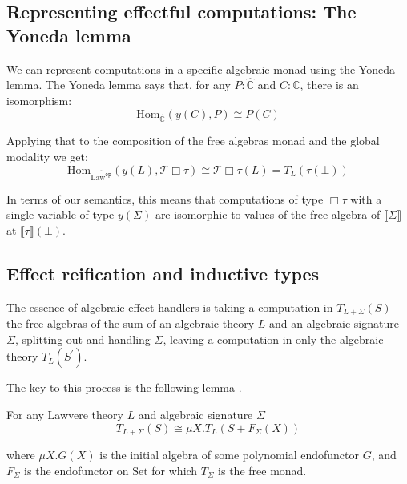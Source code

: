 \documentclass[acmsmall, screen, nonacm]{acmart}
\theoremstyle{definition}
\newcommand{\glob}{\mathop{\Box}}
\newcommand{\cat}{\mathbb{C}}
\newcommand{\catobj}{C}
\newcommand{\setc}{\mathrm{Set}}
\newcommand{\psh}{\widehat{\cat}}
\newcommand{\initial}{\bot}
\newcommand{\lawc}{\mathrm{Law}}
\newcommand{\lawcop}{\lawc^{\mathtt{op}}}
\newcommand{\pshlawcop}{\widehat{\lawcop}}
\newcommand{\yoneda}[1]{y(#1)}
\newcommand{\homset}[3]{\mathrm{Hom}_{#1}(#2, #3)}
\newcommand{\sem}[1]{\llbracket #1 \rrbracket}
\newcommand{\mon}{\mathcal{T}}
\newcommand{\types}{\mathrel{:}}
\begin{document}
\subsection{Representing effectful computations: The Yoneda lemma}

We can represent computations in a specific algebraic monad using the
Yoneda lemma. The Yoneda lemma says that, for any $P \types \psh$ and
$\catobj \types \cat$, there is an isomorphism:
\begin{equation*}
  \homset{\psh}{\yoneda{\catobj}}{P} \cong P(\catobj)
\end{equation*}

Applying that to the composition of the free algebras monad and the
global modality we get:
\begin{equation*}
  \homset{\pshlawcop}{\yoneda{L}}{\mon{\glob \tau}} \cong \mon{\glob \tau}(L) = T_L(\tau(\initial))
\end{equation*}

In terms of our semantics, this means that computations of type
$\glob \tau$ with a single variable of type $\yoneda{\Sigma}$ are
isomorphic to values of the free algebra of $\sem{\Sigma}$ at
$\sem{\tau}(\initial)$.

\subsection{Effect reification and inductive types}

The essence of algebraic effect handlers is taking a computation in
$T_{L + \Sigma}(S)$ the free algebras of the sum of an algebraic theory
$L$ and an algebraic signature $\Sigma$, splitting out and handling
$\Sigma$, leaving a computation in only the algebraic theory
$T_{L}(S^\prime)$.

The key to this process is the following lemma
\cite{hyland2006combining}.
\begin{lemma}
\label{lemma:sums}
  For any Lawvere theory $L$ and algebraic signature $\Sigma$
  \begin{equation*}
  T_{L + \Sigma}(S) \cong \mu X.T_L(S + F_\Sigma(X))
  \end{equation*}
\end{lemma}
where $\mu X.G(X)$ is the initial algebra of some polynomial endofunctor
$G$, and $F_\Sigma$ is the endofunctor on $\setc$ for which $T_{\Sigma}$
is the free monad.
\end{document}
